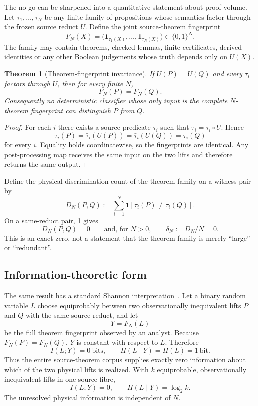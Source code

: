 \documentclass[10pt,a4paper]{article}
\newtheorem{theorem}{Theorem}[section]
\theoremstyle{definition}
\theoremstyle{remark}
\begin{document}
The no-go can be sharpened into a quantitative statement about proof volume.
Let \(\tau_1,\ldots,\tau_N\) be any finite family of propositions whose
semantics factor through the frozen source reduct \(U\).  Define the joint
source-theorem fingerprint
\[
F_N(X)
=
\bigl(\mathbf 1_{\tau_1(X)},\ldots,\mathbf 1_{\tau_N(X)}\bigr)
\in\{0,1\}^N .
\]
The family may contain theorems, checked lemmas, finite certificates, derived
identities or any other Boolean judgements whose truth depends only on
\(U(X)\).

\begin{theorem}[Theorem-fingerprint invariance]
\label{thm:fingerprint}
If \(U(P)=U(Q)\) and every \(\tau_i\) factors through \(U\), then for every
finite \(N\),
\[
\boxed{F_N(P)=F_N(Q).}
\]
Consequently no deterministic classifier whose only input is the complete
\(N\)-theorem fingerprint can distinguish \(P\) from \(Q\).
\end{theorem}

\begin{proof}
For each \(i\) there exists a source predicate \(\bar\tau_i\) such that
\(\tau_i=\bar\tau_i\circ U\).  Hence
\[
\tau_i(P)=\bar\tau_i(U(P))
=\bar\tau_i(U(Q))=\tau_i(Q)
\]
for every \(i\).  Equality holds coordinatewise, so the fingerprints are
identical.  Any post-processing map receives the same input on the two lifts
and therefore returns the same output.
\end{proof}

Define the physical discrimination count of the theorem family on a witness
pair by
\[
D_N(P,Q)
:=
\sum_{i=1}^N
\mathbf 1\!\left[\tau_i(P)\neq\tau_i(Q)\right].
\]
On a same-reduct pair, \cref{thm:fingerprint} gives
\[
\boxed{D_N(P,Q)=0}
\qquad\text{and, for }N>0,\qquad
\boxed{\delta_N:=D_N/N=0.}
\]
This is an exact zero, not a statement that the theorem family is merely
``large'' or ``redundant''.

\subsection{Information-theoretic form}

The same result has a standard Shannon interpretation~\cite{Shannon1948}.
Let a binary random variable \(L\) choose equiprobably between two
observationally inequivalent lifts \(P\) and \(Q\) with the same source
reduct, and let
\[
Y=F_N(L)
\]
be the full theorem fingerprint observed by an analyst.  Because
\(F_N(P)=F_N(Q)\), \(Y\) is constant with respect to \(L\).  Therefore
\[
\boxed{I(L;Y)=0\ \text{bits}},
\qquad
\boxed{H(L\mid Y)=H(L)=1\ \text{bit}}.
\]
Thus the entire source-theorem corpus supplies exactly zero information about
which of the two physical lifts is realized.  With \(k\) equiprobable,
observationally inequivalent lifts in one source fibre,
\[
I(L;Y)=0,
\qquad
H(L\mid Y)=\log_2 k .
\]
The unresolved physical information is independent of \(N\).
\end{document}
